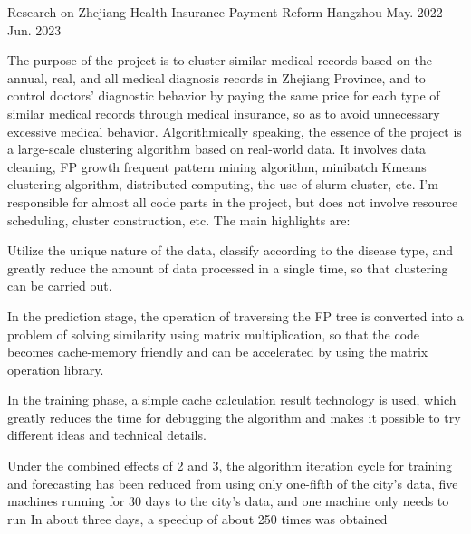 \begin{cventries}
	\cventry
	{} %
	{Research on Zhejiang Health Insurance Payment Reform} %
	{Hangzhou} %
	{May. 2022 - Jun. 2023} %
	{
		The purpose of the project is to cluster similar medical records based on the annual, real, and all medical diagnosis records in Zhejiang Province, and to control doctors' diagnostic behavior by paying the same price for each type of similar medical records through medical insurance, so as to avoid unnecessary excessive medical behavior. \newline
		Algorithmically speaking, the essence of the project is a large-scale clustering algorithm based on real-world data. It involves data cleaning, FP growth frequent pattern mining algorithm, minibatch Kmeans clustering algorithm, distributed computing, the use of slurm cluster, etc. I'm responsible for almost all code parts in the project, but does not involve resource scheduling, cluster construction, etc. \newline
		The main highlights are: \newline
		\vspace{3.5mm}
		\begin{cvitems} %
			\item{Utilize the unique nature of the data, classify according to the disease type, and greatly reduce the amount of data processed in a single time, so that clustering can be carried out.}
			\item{In the prediction stage, the operation of traversing the FP tree is converted into a problem of solving similarity using matrix multiplication, so that the code becomes cache-memory friendly and can be accelerated by using the matrix operation library.}
			\item{In the training phase, a simple cache calculation result technology is used, which greatly reduces the time for debugging the algorithm and makes it possible to try different ideas and technical details.}
			\item {Under the combined effects of 2 and 3, the algorithm iteration cycle for training and forecasting has been reduced from using only one-fifth of the city's data, five machines running for 30 days to the city's data, and one machine only needs to run In about three days, a speedup of about 250 times was obtained}
		\end{cvitems}
	}

\end{cventries}

